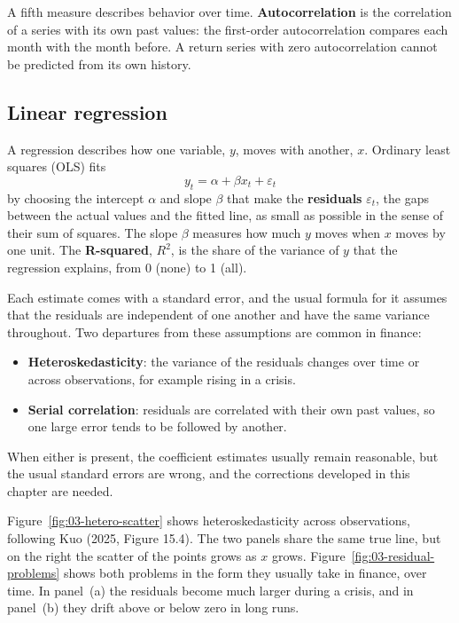 A fifth measure describes behavior over time. \textbf{Autocorrelation} is the correlation of a series with its own past values: the first-order autocorrelation compares each month with the month before. A return series with zero autocorrelation cannot be predicted from its own history.

\subsection{Linear regression}
\label{sec:03-regression}

A regression describes how one variable, $y$, moves with another, $x$. Ordinary least squares (OLS) fits
\begin{equation}
  y_t = \alpha + \beta x_t + \varepsilon_t
  \label{eq:03-ols}
\end{equation}
by choosing the intercept $\alpha$ and slope $\beta$ that make the \textbf{residuals} $\varepsilon_t$, the gaps between the actual values and the fitted line, as small as possible in the sense of their sum of squares. The slope $\beta$ measures how much $y$ moves when $x$ moves by one unit. The \textbf{R-squared}, $R^2$, is the share of the variance of $y$ that the regression explains, from 0 (none) to 1 (all).

Each estimate comes with a standard error, and the usual formula for it assumes that the residuals are independent of one another and have the same variance throughout. Two departures from these assumptions are common in finance:

\begin{itemize}
  \item \textbf{Heteroskedasticity}: the variance of the residuals changes over time or across observations, for example rising in a crisis.
  \item \textbf{Serial correlation}: residuals are correlated with their own past values, so one large error tends to be followed by another.
\end{itemize}

When either is present, the coefficient estimates usually remain reasonable, but the usual standard errors are wrong, and the corrections developed in this chapter are needed.

Figure~\ref{fig:03-hetero-scatter} shows heteroskedasticity across observations, following Kuo (2025, Figure 15.4). The two panels share the same true line, but on the right the scatter of the points grows as $x$ grows. Figure~\ref{fig:03-residual-problems} shows both problems in the form they usually take in finance, over time. In panel~(a) the residuals become much larger during a crisis, and in panel~(b) they drift above or below zero in long runs.

